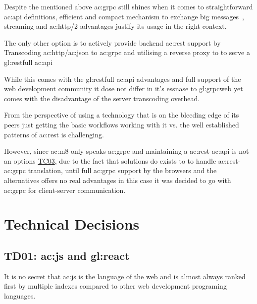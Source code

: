 Despite the mentioned above \gls{ac:grpc} still shines when it comes to straightforward \gls{ac:api} definitions, efficient and compact mechanism to exchange big messages~\citep{richardson2018microservices}, streaming and \gls{ac:http}/2 advantages justify its usage in the right context. 


The only other option is to actively provide backend \gls{ac:rest} support by Transcoding \gls{ac:http}/\gls{ac:json} to \gls{ac:grpc} and utilising a reverse proxy to to serve a \gls{gl:restfull} \gls{ac:api}~\citep{grpcgateway}


While this comes with the \gls{gl:restfull} \gls{ac:api} advantages and full support of the web development community it dose not differ in it's essnase to \gls{gl:grpcweb} yet comes with the disadvantage of the server transcoding overhead.


From the perspective of using a technology that is on the bleeding edge of its peers just getting the basic workflows working with it vs. the well established patterns of \gls{ac:rest} is challenging.

However, since \gls{ac:m8} only speaks \gls{ac:grpc} and maintaining a \gls{ac:rest} \gls{ac:api} is not an options \hyperref[tab:actc]{TC03}, due to the fact that solutions do exists to to handle \gls{ac:rest}-\gls{ac:grpc} translation, until full \gls{ac:grpc} support by the browsers and the alternatives offers no real advantages in this case it was decided to go with \gls{ac:grpc} for client-server communication.

\section{Technical Decisions}

\subsection{TD01: \acrlong{ac:js} and \gls{gl:react}}\label{abtd:01}

It is no secret that \gls{ac:js} is the language of the web and is almost always ranked first by multiple indexes compared to other web development programing languages.

